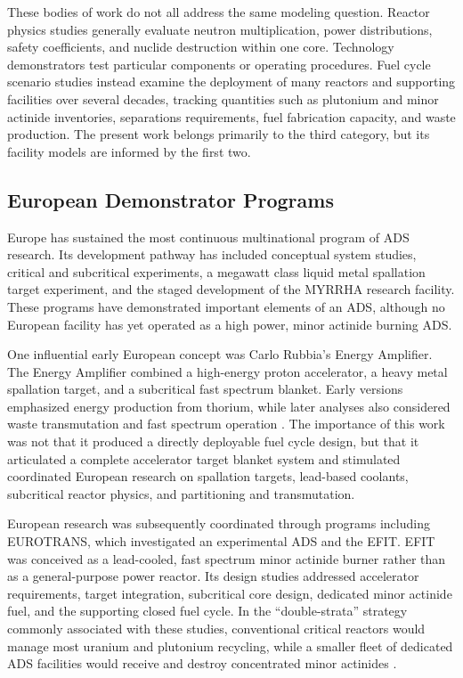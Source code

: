 These bodies of work do not all address the same modeling question. Reactor
physics studies generally evaluate neutron multiplication, power
distributions, safety coefficients, and nuclide destruction within one core.
Technology demonstrators test particular components or operating procedures.
Fuel cycle scenario studies instead examine the deployment of many reactors
and supporting facilities over several decades, tracking quantities such as
plutonium and minor actinide inventories, separations requirements, fuel
fabrication capacity, and waste production. The present work belongs primarily
to the third category, but its facility models are informed by the first two.

\subsection{European Demonstrator Programs}
\label{subsec:european-ads-programs}

Europe has sustained the most continuous multinational program of \gls{ADS}
research. Its development pathway has included conceptual system studies,
critical and subcritical experiments, a megawatt class liquid metal
spallation target experiment, and the staged development of the \gls{MYRRHA}
research facility. These programs have demonstrated important elements of an
\gls{ADS}, although no European facility has yet operated as a high power,
minor actinide burning \gls{ADS}.

One influential early European concept was Carlo Rubbia's
Energy Amplifier. The Energy Amplifier combined a high-energy proton
accelerator, a heavy metal spallation target, and a subcritical fast spectrum
blanket. Early versions emphasized energy production from thorium, while later
analyses also considered waste transmutation and fast spectrum operation
\cite{rubbia_conceptual_1995}. The importance of this work was not that
it produced a directly deployable fuel cycle design, but that it articulated
a complete accelerator target blanket system and stimulated coordinated
European research on spallation targets, lead-based coolants, subcritical
reactor physics, and partitioning and transmutation.

European research was subsequently coordinated through programs including
EUROTRANS, which investigated an experimental \gls{ADS} and the \gls{EFIT}.
\gls{EFIT} was conceived as a lead-cooled,
fast spectrum minor actinide burner rather than as a general-purpose power
reactor. Its design studies addressed accelerator requirements, target
integration, subcritical core design, dedicated minor actinide fuel, and the
supporting closed fuel cycle. In the ``double-strata'' strategy commonly
associated with these studies, conventional critical reactors would manage
most uranium and plutonium recycling, while a smaller fleet of dedicated \gls{ADS}
facilities would receive and destroy concentrated minor actinides \cite{nea_regional_scenarios_2009}.

